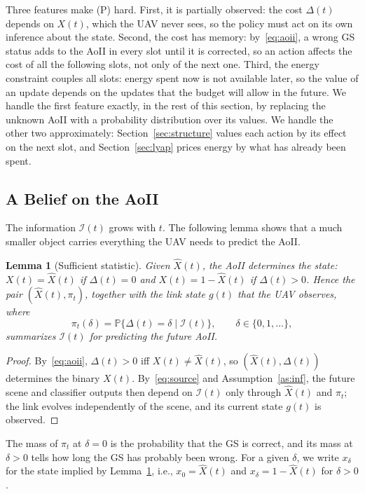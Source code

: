 \documentclass[5p,twocolumn]{elsarticle}
\newtheorem{lemma}{Lemma}
\theoremstyle{remark}
\newcommand{\Prob}{\mathbb{P}}
\newcommand{\I}{\mathcal{I}}
\begin{document}
Three features make (P) hard. First, it is partially observed: the cost $\Delta(t)$ depends on $X(t)$, which the UAV never sees, so the policy must act on its own inference about the state. Second, the cost has memory: by~\eqref{eq:aoii}, a wrong GS status adds to the AoII in every slot until it is corrected, so an action affects the cost of all the following slots, not only of the next one. Third, the energy constraint couples all slots: energy spent now is not available later, so the value of an update depends on the updates that the budget will allow in the future. We handle the first feature exactly, in the rest of this section, by replacing the unknown AoII with a probability distribution over its values. We handle the other two approximately: Section~\ref{sec:structure} values each action by its effect on the next slot, and Section~\ref{sec:lyap} prices energy by what has already been spent.

\subsection{A Belief on the AoII}\label{sec:belief}
The information $\I(t)$ grows with $t$. The following lemma shows that a much smaller object carries everything the UAV needs to predict the AoII.

\begin{lemma}[Sufficient statistic]\label{lem:suff}
Given $\hat X(t)$, the AoII determines the state: $X(t)=\hat X(t)$ if $\Delta(t)=0$ and $X(t)=1-\hat X(t)$ if $\Delta(t)>0$. Hence the pair $(\hat X(t),\pi_t)$, together with the link state $g(t)$ that the UAV observes, where
\begin{equation}\label{eq:belief}
\pi_t(\delta)=\Prob\big\{\Delta(t)=\delta\mid\I(t)\big\},\qquad\delta\in\{0,1,\dots\},
\end{equation}
summarizes $\I(t)$ for predicting the future AoII.
\end{lemma}
\begin{proof}
By~\eqref{eq:aoii}, $\Delta(t)>0$ iff $X(t)\neq\hat X(t)$, so $(\hat X(t),\Delta(t))$ determines the binary $X(t)$. By~\eqref{eq:source} and Assumption~\ref{as:inf}, the future scene and classifier outputs then depend on $\I(t)$ only through $\hat X(t)$ and $\pi_t$; the link evolves independently of the scene, and its current state $g(t)$ is observed.
\end{proof}

The mass of $\pi_t$ at $\delta=0$ is the probability that the GS is correct, and its mass at $\delta>0$ tells how long the GS has probably been wrong. For a given $\delta$, we write $x_\delta$ for the state implied by Lemma~\ref{lem:suff}, i.e., $x_0=\hat X(t)$ and $x_\delta=1-\hat X(t)$ for $\delta>0$.
\end{document}
